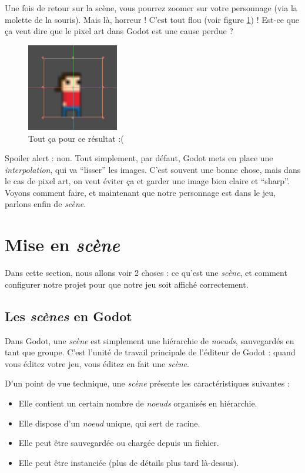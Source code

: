 Une fois de retour sur la scène, vous pourrez zoomer sur votre personnage (via la molette de la souris). Mais là, horreur ! C'est tout flou (voir figure \ref{lvl1-blurred}) ! Est-ce que ça veut dire que le pixel art dans Godot est une cause perdue ?

\begin{figure}
  \begin{center}
    \includegraphics[width=4cm]{img/lvl1-blurred.png}
  \end{center}
  \caption{\label{lvl1-blurred} Tout ça pour ce résultat :( }
\end{figure}

Spoiler alert : non. Tout simplement, par défaut, Godot mets en place une \emph{interpolation}, qui va ``lisser'' les images. C'est souvent une bonne chose, mais dans le cas de pixel art, on veut éviter ça et garder une image bien claire et ``sharp''. Voyons comment faire, et maintenant que notre personnage est dans le jeu, parlons enfin de \emph{scène}.

\section{Mise en \emph{scène}}

Dans cette section, nous allons voir 2 choses : ce qu'est une \emph{scène}, et comment configurer notre projet pour que notre jeu soit affiché correctement.

\subsection{Les \emph{scènes} en Godot}

Dans Godot, une \emph{scène} est simplement une hiérarchie de \emph{noeuds}, sauvegardés en tant que groupe. C'est l'unité de travail principale de l'éditeur de Godot : quand vous éditez votre jeu, vous éditez en fait une  \emph{scène}.

D'un point de vue technique, une \emph{scène} présente les caractéristiques suivantes :

\begin{itemize}
\item Elle contient un certain nombre de \emph{noeuds} organisés en hiérarchie.
\item Elle dispose d'un \emph{noeud} unique, qui sert de racine.
\item Elle peut être sauvegardée ou chargée depuis un fichier.
\item Elle peut être instanciée (plus de détails plus tard là-dessus).
\end{itemize}

